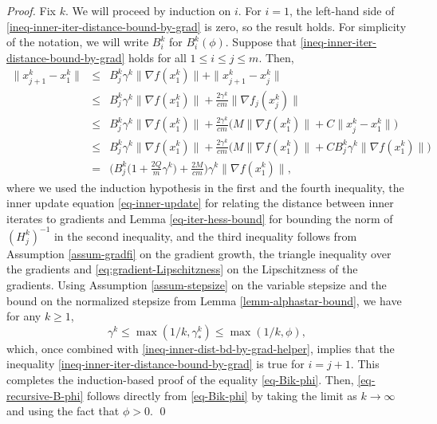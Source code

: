 \documentclass[final,numbook]{svjour3}
\begin{document}
\begin{proof} Fix $k$. We will proceed by induction on $i$. For $i=1$, the left-hand side of \eqref{ineq-inner-iter-distance-bound-by-grad} is zero, so the result holds. For simplicity of the notation, we will write $B_i^k$ for $B_i^k(\phi)$. Suppose that \eqref{ineq-inner-iter-distance-bound-by-grad} holds for all $1 \leq i \leq j \leq m$. Then,
\begin{eqnarray}
	\|x_{j+1}^k - x_1^k \| 
	&\leq& B_j^k \gamma^k \|\nabla f(x_1^k)\|  + \|x_{j+1}^k - x_j^k \| \nonumber \\
	
	&\leq & B_j^k \gamma^k \|\nabla f(x_1^k)\|  + \frac{2\gamma^k}{cm} \big\| \nabla f_j (x_j^k)\big\|  \nonumber \\
	
	&\leq & B_j^k \gamma^k \|\nabla f(x_1^k)\|  + \frac{2\gamma^k }{cm} \bigg( M \big\| \nabla f (x_1^k)\big\| + {C} \big\| x_j^k - x_1^k \big\| \bigg) \nonumber \\
	&\leq & B_j^k \gamma^k \|\nabla f(x_1^k)\|  + \frac{2\gamma^k }{cm} \bigg( M \big\| \nabla f (x_1^k)\big\| + {C} B_j^k \gamma^k \|\nabla f(x_1^k)\| \bigg) \nonumber \\
	&= & \bigg( B_j^k \big(1 + \frac{2Q}{m} \gamma^k\big) + \frac{2M}{cm}\bigg) \gamma^k \|\nabla f(x_1^k)\|, \label{ineq-inner-dist-bd-by-grad-helper}
\end{eqnarray}
where we used the induction hypothesis in the first and the fourth inequality, the inner update equation \eqref{eq-inner-update} for relating the distance between inner iterates to gradients and Lemma \ref{eq-iter-hess-bound} for bounding the norm of $(H_j^k)^{-1}$ in the second inequality, and the third inequality follows from Assumption \ref{assum-gradfi} on the gradient growth, the triangle inequality over the gradients and \eqref{eq:gradient-Lipschitzness} on the Lipschitzness of the gradients. Using Assumption \ref{assum-stepsize} on the variable stepsize and the bound on the normalized stepsize from Lemma \ref{lemm-alphastar-bound}, we have for any $k\geq 1$, 
 $$\gamma^k \leq  \max(1/k,\gamma_*^k)\leq \max(1/k, \phi),$$
which, once combined with \eqref{ineq-inner-dist-bd-by-grad-helper}, implies that the inequality \eqref{ineq-inner-iter-distance-bound-by-grad} is true for $i=j+1$. This completes the induction-based proof of the equality \eqref{eq-Bik-phi}. Then, \eqref{eq-recursive-B-phi} follows directly from \eqref{eq-Bik-phi} by taking the limit as $k\to \infty$ and using the fact that $\phi>0$. \qed
\end{proof}
\end{document}
